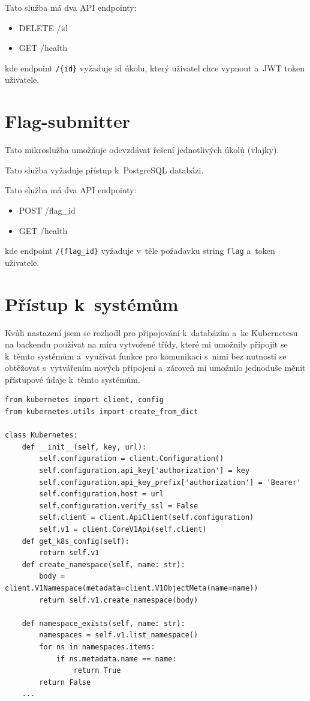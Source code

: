 \documentclass[12pt, a4paper,
oneside,      %
openright
]{report}
\begin{document}
Tato služba má dva API endpointy:
\begin{itemize}
	\item DELETE /{id}
	\item GET /health
\end{itemize}
kde endpoint \texttt{/\{id\}} vyžaduje id úkolu, který uživatel chce vypnout a~JWT token uživatele.

\section{Flag-submitter}
Tato mikroslužba umožňuje odevzdávat řešení jednotlivých úkolů (vlajky).

Tato služba vyžaduje přístup k~PostgreSQL databázi.

Tato služba má dva API endpointy:
\begin{itemize}
	\item POST /{flag\_id}
	\item GET /health
\end{itemize}
kde endpoint \texttt{/\{flag\_id\}} vyžaduje v~těle požadavku string \texttt{flag} a~token uživatele.

\section{Přístup k~systémům}
Kvůli nastazení jsem se rozhodl pro připojování k~databázím a~ke Kubernetesu na backendu používat na míru vytvořené třídy, které mi umožnily připojit se k~těmto systémům a~využívat funkce pro komunikaci s~nimi bez nutnosti se obtěžovat s~vytvářením nových připojení a~zároveň mi umožnilo jednoduše měnit přístupové údaje k~těmto systémům.

\begin{lstlisting}[style=Python, caption=Ukázka třídy pro připojení ke Kubernetes]
from kubernetes import client, config
from kubernetes.utils import create_from_dict

class Kubernetes:
    def __init__(self, key, url):
        self.configuration = client.Configuration()
        self.configuration.api_key['authorization'] = key
        self.configuration.api_key_prefix['authorization'] = 'Bearer'
        self.configuration.host = url
        self.configuration.verify_ssl = False
        self.client = client.ApiClient(self.configuration)
        self.v1 = client.CoreV1Api(self.client)
    def get_k8s_config(self):
        return self.v1
    def create_namespace(self, name: str):
        body = client.V1Namespace(metadata=client.V1ObjectMeta(name=name))
        return self.v1.create_namespace(body)

    def namespace_exists(self, name: str):
        namespaces = self.v1.list_namespace()
        for ns in namespaces.items:
            if ns.metadata.name == name:
                return True
        return False
	...
\end{lstlisting}
\end{document}
